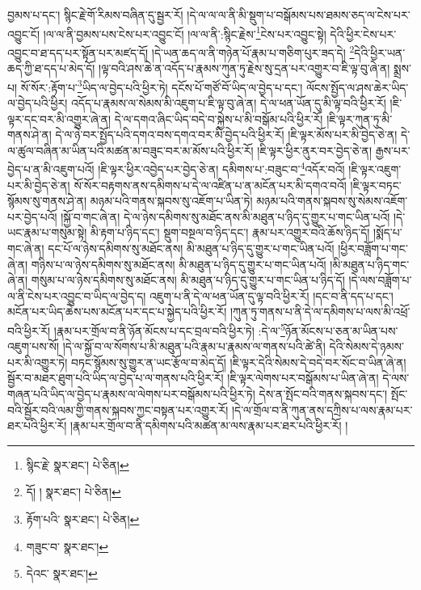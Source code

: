 བྱམས་པ་དང་། སྙིང་རྗེ་གོ་རིམས་བཞིན་དུ་སྦྱར་རོ། །དེ་ལ་ལ་ལ་ནི་མི་སྡུག་པ་བསྒོམས་པས་ཐམས་ཅད་ལ་ངེས་པར་འབྱུང་ངོ། །ལ་ལ་ནི་བྱམས་པས་ངེས་པར་འབྱུང་ངོ། །ལ་ལ་ནི་:སྙིང་རྗེས་\footnote{སྙིང་རྗེ་  སྣར་ཐང་།  པེ་ཅིན། }ངེས་པར་འབྱུང་སྟེ། དེའི་ཕྱིར་ངེས་པར་འབྱུང་བ་ཐ་དད་པར་སྟོན་པར་མཛད་དོ། །དེ་ཡན་ཆད་ལ་ནི་གཉེན་པོ་རྣམ་པ་གཅིག་པུར་ཟད་དེ། \footnote{དོ། །   སྣར་ཐང་།  པེ་ཅིན། }དེའི་ཕྱིར་ཡན་ཆད་ཀྱི་ཐ་དད་པ་མེད་དོ། །ལྟ་བའི་ཤས་ཆེ་ན་འདོད་པ་རྣམས་ཀུན་ཏུ་རྗེས་སུ་དྲན་པར་འགྱུར་བ་ཇི་ལྟ་བུ་ཞེ་ན། སྨྲས་པ། སོ་སོར་:རྟོག་པ་\footnote{རྟོག་པའི་  སྣར་ཐང་།  པེ་ཅིན། }ཡིད་ལ་བྱེད་པའི་ཕྱིར་ཏེ། དངོས་པོ་གཙོ་བོ་ཡིད་ལ་བྱེད་པ་དང་། ལོངས་སྤྱོད་ལ་ཤས་ཆེར་ཡིད་ལ་བྱེད་པའི་ཕྱིར། འདོད་པ་རྣམས་ལ་སེམས་མི་འཇུག་པ་ཇི་ལྟ་བུ་ཞེ་ན། དེ་ལ་ཕན་ཡོན་དུ་མི་ལྟ་བའི་ཕྱིར་རོ། །ཇི་ལྟར་དང་བར་མི་འགྱུར་ཞེ་ན། དེ་ལ་དགའ་ཞིང་ཡིད་བདེ་བ་སྐྱེས་པ་མི་བསྒོམ་པའི་ཕྱིར་རོ། །ཇི་ལྟར་ཀུན་ཏུ་མི་གནས་ཤེ་ན། དེ་ལ་ཉེ་བར་སྤྱོད་པའི་དགའ་བས་དགའ་བར་མི་བྱེད་པའི་ཕྱིར་རོ། །ཇི་ལྟར་མོས་པར་མི་བྱེད་ཅེ་ན། དེ་ལ་ཚུལ་བཞིན་མ་ཡིན་པའི་མཚན་མ་བཟུང་བར་མ་མོས་པའི་ཕྱིར་རོ། །ཇི་ལྟར་ཕྱིར་ནུར་བར་བྱེད་ཅེ་ན། རྒྱས་པར་བྱེད་པ་ན་མི་འཇུག་པའོ། །ཇི་ལྟར་ཕྱིར་འབྱེད་པར་བྱེད་ཅེ་ན། དམིགས་པ་:བཟུང་བ་\footnote{གཟུང་བ་  སྣར་ཐང་། }འདོར་བའོ། །ཇི་ལྟར་འཇུག་པར་མི་བྱེད་ཅེ་ན། སོ་སོར་བརྟགས་ནས་དམིགས་པ་དེ་ལ་འཛིན་པ་ན་མངོན་པར་མི་དགའ་བའོ། །ཇི་ལྟར་བཏང་སྙོམས་སུ་གནས་ཤེ་ན། མཉམ་པའི་གནས་སྐབས་སུ་འཇོག་པ་ཡིན་ཏེ། མཉམ་པའི་གནས་སྐབས་སུ་སེམས་འཇོག་པར་བྱེད་པའོ། །སྐྱོ་བ་གང་ཞེ་ན། དེ་ལ་ཉེས་དམིགས་སུ་མཐོང་ནས་མི་མཐུན་པ་ཉིད་དུ་གྱུར་པ་གང་ཡིན་པའོ། །དེ་ཡང་རྣམ་པ་གསུམ་སྟེ། མི་རྟག་པ་ཉིད་དང་། སྡུག་བསྔལ་བ་ཉིད་དང་། རྣམ་པར་འགྱུར་བའི་ཆོས་ཉིད་དོ། །སྨོད་པ་གང་ཞེ་ན། དང་པོ་ལ་ཉེས་དམིགས་སུ་མཐོང་ནས། མི་མཐུན་པ་ཉིད་དུ་གྱུར་པ་གང་ཡིན་པའོ། །ཕྱིར་བཟློག་པ་གང་ཞེ་ན། གཉིས་པ་ལ་ཉེས་དམིགས་སུ་མཐོང་ནས། མི་མཐུན་པ་ཉིད་དུ་གྱུར་པ་གང་ཡིན་པའོ། །མི་མཐུན་པ་ཉིད་གང་ཞེ་ན། གསུམ་པ་ལ་ཉེས་དམིགས་སུ་མཐོང་ནས། མི་མཐུན་པ་ཉིད་དུ་གྱུར་པ་གང་ཡིན་པ་ཉིད་དོ། །དེ་ལས་བཟློག་པ་ལ་ནི་ངེས་པར་འབྱུང་བ་ཡིད་ལ་བྱེད་ད། འཇུག་པ་ནི་དེ་ལ་ཕན་ཡོན་དུ་ལྟ་བའི་ཕྱིར་རོ། །དང་བ་ནི་དད་པ་དང་། མངོན་པར་ཡིད་ཆེས་པས་མངོན་པར་དང་པ་སྐྱེད་པའི་ཕྱིར་རོ། །ཀུན་ཏུ་གནས་པ་ནི་དེ་ལ་དམིགས་པ་ལས་མི་འཕྲོ་བའི་ཕྱིར་རོ། །རྣམ་པར་གྲོལ་བ་ནི་ཉོན་མོངས་པ་དང་བྲལ་བའི་ཕྱིར་ཏེ། :དེ་ལ་\footnote{དེའང་  སྣར་ཐང་། }ཉོན་མོངས་པ་ཅན་མ་ཡིན་པས་འཇུག་པས་སོ། །དེ་ལ་སྐྱོ་བ་ལ་སོགས་པ་མི་མཐུན་པའི་རྣམ་པ་རྣམས་ལ་གནས་པའི་ཚེ་ནི། དེའི་སེམས་དེ་ཉམས་པར་མི་འགྱུར་ཏེ། བཏང་སྙོམས་སུ་གྱུར་ན་ཡང་རྩོལ་བ་མེད་དོ། །ཇི་ལྟར་དེའི་སེམས་དེ་བདེ་བར་སོང་བ་ཡིན་ཞེ་ན། སྦྱོར་བ་མཐར་ཐུག་པའི་ཡིད་ལ་བྱེད་པ་ལ་གནས་པའི་ཕྱིར་རོ། །ཇི་ལྟར་ལེགས་པར་བསྒོམས་པ་ཡིན་ཞེ་ན། དེ་ལས་གཞན་པའི་ཡིད་ལ་བྱེད་པ་རྣམས་ལ་ལེགས་པར་བསྒོམས་པའི་ཕྱིར་ཏེ། དེས་ན་སྤོང་བའི་གནས་སྐབས་དང་། སྤོང་བའི་སྦྱོར་བའི་ལམ་གྱི་གནས་སྐབས་ཀྱང་བསྟན་པར་འགྱུར་རོ། །དེ་ལ་གྲོལ་བ་ནི་ཀུན་ནས་དཀྲིས་པ་ལས་རྣམ་པར་ཐར་པའི་ཕྱིར་རོ། །རྣམ་པར་གྲོལ་བ་ནི་དམིགས་པའི་མཚན་མ་ལས་རྣམ་པར་ཐར་པའི་ཕྱིར་རོ། །
